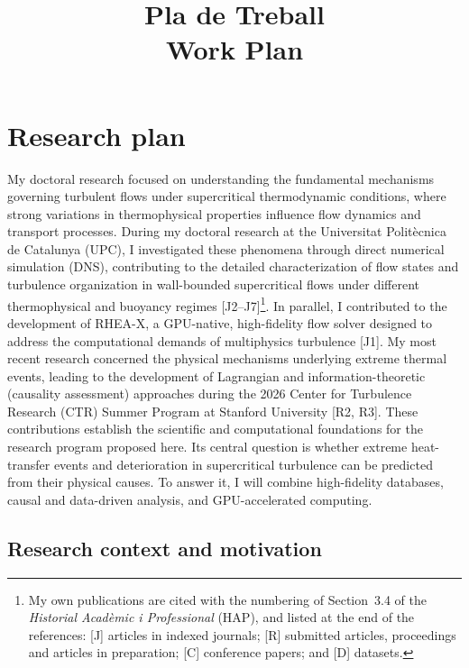 \documentclass[11pt]{article}
\title{\textbf{Pla de Treball}\\[2pt]\large Work Plan}
\author{\Large \CandName}
\date{}
\begin{document}
\maketitle
\thispagestyle{plain}
\vspace{0.5cm}
\begin{center}\postdata\end{center}

\newpage
\tableofcontents

\section{Research plan}\label{sec:research}

My doctoral research focused on understanding the fundamental mechanisms governing turbulent flows under supercritical thermodynamic conditions, where strong variations in thermophysical properties influence flow dynamics and transport processes.
During my doctoral research at the Universitat Politècnica de Catalunya (UPC), I investigated these phenomena through direct numerical simulation (DNS), contributing to the detailed characterization of flow states and turbulence organization in wall-bounded supercritical flows under different thermophysical and buoyancy regimes [J2--J7]\footnote{My own publications are cited with the numbering of Section~3.4 of the \textit{Historial Acadèmic i Professional} (HAP), and listed at the end of the references: [J] articles in indexed journals; [R] submitted articles, proceedings and articles in preparation; [C] conference papers; and [D] datasets.}.
In parallel, I contributed to the development of RHEA-X, a GPU-native, high-fidelity flow solver designed to address the computational demands of multiphysics turbulence [J1].
My most recent research concerned the physical mechanisms underlying extreme thermal events, leading to the development of Lagrangian and information-theoretic (causality assessment) approaches during the 2026 Center for Turbulence Research (CTR) Summer Program at Stanford University [R2, R3].
These contributions establish the scientific and computational foundations for the research program proposed here.
Its central question is whether extreme heat-transfer events and deterioration in supercritical turbulence can be predicted from their physical causes. To answer it, I will combine high-fidelity databases, causal and data-driven analysis, and GPU-accelerated computing.

\subsection{Research context and motivation}\label{sec:background}
\end{document}
